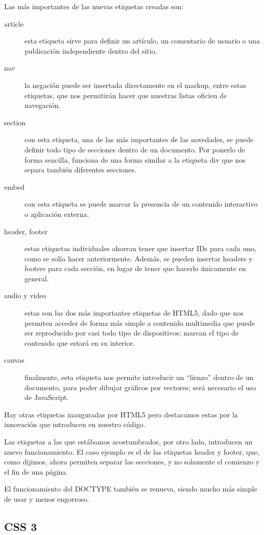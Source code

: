 Las más importantes de las nuevas etiquetas creadas son:

\begin{description}
    \item[article] esta etiqueta sirve para definir un artículo, un comentario de usuario o una publicación independiente dentro del sitio.
    \item[nav] la negación puede ser insertada directamente en el markup, entre estas etiquetas, que nos permitirán hacer que nuestras listas oficien de navegación.
    \item[section] con esta etiqueta, una de las más importantes de las novedades, se puede definir todo tipo de secciones dentro de un documento. Por ponerlo de forma sencilla, funciona de una forma similar a la etiqueta div que nos separa también diferentes secciones.
    \item[embed] con esta etiqueta se puede marcar la presencia de un contenido interactivo o aplicación externa.
    \item[header, footer] estas etiquetas individuales ahorran tener que insertar IDs para cada uno, como se solía hacer anteriormente. Además, se pueden insertar headers y footers para cada sección, en lugar de tener que hacerlo únicamente en general.
    \item[audio y video] estas son las dos más importantes etiquetas de HTML5, dado que nos permiten acceder de forma más simple a contenido multimedia que puede ser reproducido por casi todo tipo de dispositivos; marcan el tipo de contenido que estará en su interior.
    \item[canvas] finalmente, esta etiqueta nos permite introducir un “lienzo” dentro de un documento, para poder dibujar gráficos por vectores; será necesario el uso de JavaScript.
\end{description}

Hay otras etiquetas inauguradas por HTML5 pero destacamos estas por la innovación que introducen en nuestro código. 

Las etiquetas a las que estábamos acostumbrados, por otro lado, introducen un nuevo funcionamiento. El caso ejemplo es el de las etiquetas header y footer, que, como dijimos, ahora permiten separar las secciones, y no solamente el comienzo y el fin de una página.

El funcionamiento del DOCTYPE también se renueva, siendo mucho más simple de usar y menos engorroso. 

\subsection{CSS 3}

